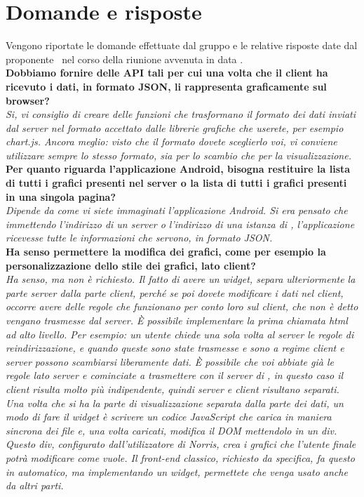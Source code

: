 \section{Domande e risposte}
	Vengono riportate le domande effettuate dal gruppo \groupname{} e le relative risposte date dal proponente \proponente\, nel corso della riunione avvenuta in data .\\

	\textbf{Dobbiamo fornire delle API tali per cui una volta che il client ha ricevuto i dati, in formato JSON, li rappresenta graficamente sul browser?}\\
	\textit{Si, vi consiglio di creare delle funzioni che trasformano il formato dei dati inviati dal server nel formato accettato dalle librerie grafiche che userete, per esempio chart.js. Ancora meglio: visto che il formato dovete sceglierlo voi, vi conviene utilizzare sempre lo stesso formato, sia per lo scambio che per la visualizzazione.}\\

	\textbf{Per quanto riguarda l'applicazione Android, bisogna restituire la lista di tutti i grafici presenti nel server o la lista di tutti i grafici presenti in una singola pagina?}\\
	\textit{Dipende da come vi siete immaginati l'applicazione Android. Si era pensato che immettendo l'indirizzo di un server o l'indirizzo di una istanza di \projectname{}, l'applicazione ricevesse tutte le informazioni che servono, in formato JSON.}\\

	\textbf{Ha senso permettere la modifica dei grafici, come per esempio la personalizzazione dello stile dei grafici, lato client?}\\
	\textit{Ha senso, ma non è richiesto. Il fatto di avere un widget, separa ulteriormente la parte server dalla parte client, perché se poi dovete modificare i dati nel client, occorre avere delle regole che funzionano per conto loro sul client, che non è detto vengano trasmesse dal server. \`{E} possibile implementare la prima chiamata html ad alto livello. Per esempio: un utente chiede una sola volta al server le regole di reindirizzazione, e quando queste sono state trasmesse e sono a regime client e server possono scambiarsi liberamente dati. \`{E} possibile che voi abbiate già le regole lato server e cominciate a trasmettere con il server di \projectname{}, in questo caso il client risulta molto più indipendente, quindi server e client risultano separati. Una volta che si ha la parte di visualizzazione separata dalla parte dei dati, un modo di fare il widget è scrivere un codice JavaScript che carica in maniera sincrona dei file e, una volta caricati, modifica il DOM mettendolo in un div. Questo div, configurato dall'utilizzatore di Norris, crea i grafici che l'utente finale potrà modificare come vuole. Il front-end classico, richiesto da specifica, fa questo in automatico, ma implementando un widget, permettete che venga usato anche da altri parti.}\\
